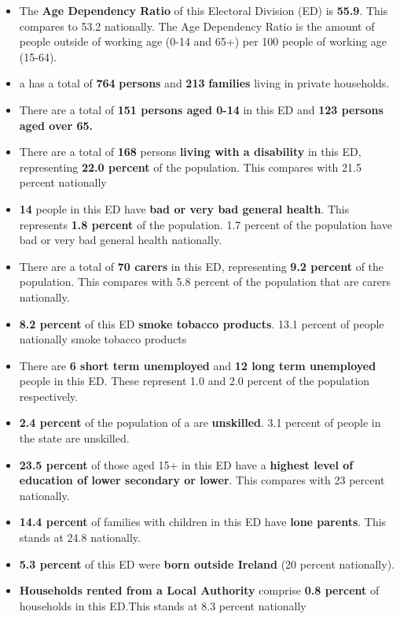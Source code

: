 \documentclass{article}
\begin{document}
\begin{itemize}

\item The \textbf{Age Dependency Ratio} of this Electoral Division (ED) is  \textbf{55.9}. This compares to 53.2 nationally. The Age Dependency Ratio is the amount of people outside of working age (0-14 and 65+) per 100 people of working age (15-64). 

\item a has a total of \textbf{\num{764}} \textbf{persons} and  \textbf{\num{213}} \textbf{families} living in private households.

\item There are a total of \textbf{151 persons aged 0-14} in this ED and \textbf{123 persons aged over 65.} 

\item There are a total of \textbf{\num{168}} persons \textbf{living with a disability} in this ED, representing \textbf{22.0 percent} of the population. This compares with  21.5 percent nationally

\item \textbf{\num{14}} people in this ED have \textbf{bad or very bad general health}. This represents \textbf{1.8 percent} of the population. 1.7 percent of the population have bad or very bad general health nationally. 

\item There are a total of \textbf{\num{70} carers} in this ED, representing \textbf{9.2 percent} of the population. This compares with 5.8 percent of the population that are carers nationally. 

\item \textbf{8.2 percent} of this ED \textbf{smoke tobacco products}. 13.1 percent of people nationally smoke tobacco products

\item There are \textbf{\num{6} short term unemployed} and \textbf{\num{12} long term unemployed} people in this ED. These represent 1.0 and 2.0 percent of the population respectively.

\item  \textbf{2.4 percent} of the population of a are \textbf{unskilled}. 3.1 percent of people in the state are unskilled.

\item \textbf{23.5 percent} of those aged 15+ in this ED have a \textbf{highest level of education of lower secondary or lower}. This compares with 23 percent nationally. 

\item \textbf{14.4 percent} of families with children in this ED have \textbf{lone parents}. This stands at 24.8 nationally.

\item \textbf{5.3 percent} of this ED were \textbf{born outside Ireland} (20 percent nationally).

\item \textbf{Households rented from a Local Authority} comprise \textbf{0.8 percent} of households in this ED.This stands at 8.3 percent nationally

\end{itemize}
\end{document}
